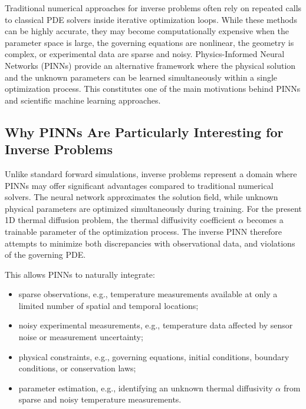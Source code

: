 Traditional numerical approaches for inverse problems often rely on repeated calls to classical PDE solvers inside iterative optimization loops. While these methods can be highly accurate, they may become computationally expensive when the parameter space is large, the governing equations are nonlinear, the geometry is complex, or experimental data are sparse and noisy. Physics-Informed Neural Networks (PINNs) provide an alternative framework where the physical solution and the unknown parameters can be learned simultaneously within a single optimization process. This constitutes one of the main motivations behind PINNs and scientific machine learning approaches.

\subsection{Why PINNs Are Particularly Interesting for Inverse Problems}

Unlike standard forward simulations, inverse problems represent a domain where PINNs may offer significant advantages compared to traditional numerical solvers. The neural network approximates the solution field, while unknown physical parameters are optimized simultaneously during training. For the present 1D thermal diffusion problem, the thermal diffusivity coefficient $\alpha$ becomes a trainable parameter of the optimization process. The inverse PINN therefore attempts to minimize both discrepancies with observational data, and violations of the governing PDE.

This allows PINNs to naturally integrate:
\begin{itemize}
    \item sparse observations, e.g., temperature measurements available at only
    a limited number of spatial and temporal locations;

    \item noisy experimental measurements, e.g., temperature data affected by
    sensor noise or measurement uncertainty;

    \item physical constraints, e.g., governing equations, initial conditions,
    boundary conditions, or conservation laws;

    \item parameter estimation, e.g., identifying an unknown thermal diffusivity
    $\alpha$ from sparse and noisy temperature measurements.
\end{itemize}

